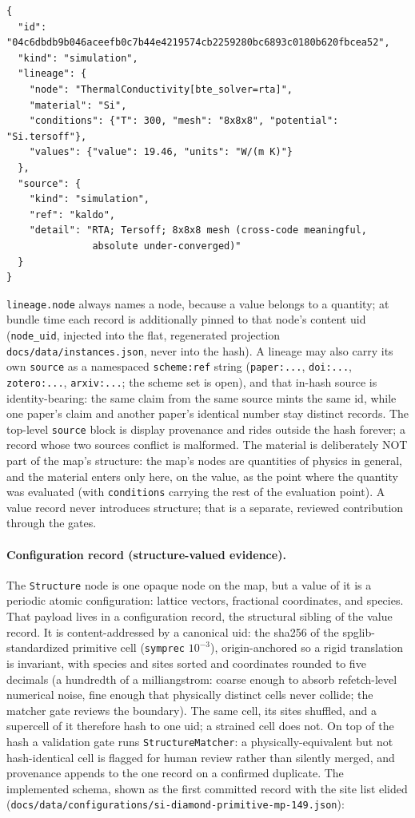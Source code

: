 \documentclass[11pt,a4paper]{article}
\begin{document}
{\small
\begin{verbatim}
{
  "id": "04c6dbdb9b046aceefb0c7b44e4219574cb2259280bc6893c0180b620fbcea52",
  "kind": "simulation",
  "lineage": {
    "node": "ThermalConductivity[bte_solver=rta]",
    "material": "Si",
    "conditions": {"T": 300, "mesh": "8x8x8", "potential": "Si.tersoff"},
    "values": {"value": 19.46, "units": "W/(m K)"}
  },
  "source": {
    "kind": "simulation",
    "ref": "kaldo",
    "detail": "RTA; Tersoff; 8x8x8 mesh (cross-code meaningful,
               absolute under-converged)"
  }
}
\end{verbatim}
}

\texttt{lineage.node} always names a node, because a value belongs to a
quantity; at bundle time each record is additionally pinned to that node's
content uid (\texttt{node\_uid}, injected into the flat, regenerated projection
\texttt{docs/data/instances.json}, never into the hash). A lineage may also
carry its own \texttt{source} as a namespaced \texttt{scheme:ref} string
(\texttt{paper:...}, \texttt{doi:...}, \texttt{zotero:...},
\texttt{arxiv:...}; the scheme set is open), and that in-hash source is
identity-bearing: the same claim from the same source mints the same id, while
one paper's claim and another paper's identical number stay distinct records.
The top-level \texttt{source} block is display provenance and rides outside
the hash forever; a record whose two sources conflict is malformed. The
material is deliberately NOT part of the map's
structure: the map's nodes are quantities of physics in general, and the
material enters only here, on the value, as the point where the quantity was
evaluated (with \texttt{conditions} carrying the rest of the evaluation
point). A value record never introduces structure; that is a separate,
reviewed contribution through the gates.

\paragraph{Configuration record (structure-valued evidence).} The
\texttt{Structure} node is one opaque node on the map, but a value of it is a
periodic atomic configuration: lattice vectors, fractional coordinates, and
species. That payload lives in a configuration record, the structural sibling of
the value record. It is content-addressed by a canonical uid: the sha256 of the
spglib-standardized primitive cell (\texttt{symprec} $10^{-3}$), origin-anchored
so a rigid translation is invariant, with species and sites sorted and
coordinates rounded to five decimals (a hundredth of a milliangstrom: coarse enough to absorb refetch-level numerical noise, fine enough that physically distinct cells never collide; the matcher gate reviews the boundary). The same cell, its sites shuffled, and a
supercell of it therefore hash to one uid; a strained cell does not. On top of
the hash a validation gate runs \texttt{StructureMatcher}: a
physically-equivalent but not hash-identical cell is flagged for human review
rather than silently merged, and provenance appends to the one record on a
confirmed duplicate. The implemented schema, shown as the first committed record
with the site list elided
(\texttt{docs/data/configurations/si-diamond-primitive-mp-149.json}):
\end{document}
